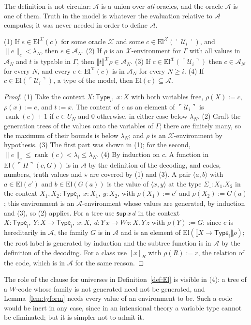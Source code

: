 \documentclass[10pt]{article}
\newcommand{\Type}{\mathsf{Type}}
\newcommand{\rk}{\operatorname{rank}}
\newcommand{\sem}[1]{\llbracket #1\rrbracket}
\newcommand{\El}{\mathrm{El}}
\newcommand{\code}[1]{\ulcorner #1\urcorner}
\newcommand{\U}{\mathcal{U}}
\newcommand{\X}{\mathcal{X}}
\newcommand{\A}{\mathcal{A}}
\begin{document}
The definition is not circular: $\A$ is a union over \emph{all} oracles,
and the oracle $\A$ is one of them. Truth in the model is whatever the
evaluation relative to $\A$ computes; it was never needed in order to
define $\A$.

\begin{lemma}\label{lem:gen}
(1) If $e\in\El^\X(c)$ for some oracle $\X$ and some $c\in\El^\X(\code{\U_i})$,
and $\|e\|_c<\lambda_N$, then $e\in\A_N$. (2) If $\rho$ is an
$\X$-environment for $\Gamma$ with all values in $\A_N$ and $t$ is typable
in $\Gamma$, then $\sem t^\X\rho\in\A_N$. (3) If $c\in\El^\X(\code{\U_i})$
then $c\in\A_N$ for every $N$, and every $e\in\El^\X(c)$ is in $\A_N$ for
every $N\ge i$. (4) If $c\in\El(\code{\U_i})$, a type of the model, then
$\El(c)\subseteq\A$.
\end{lemma}
\begin{proof}
(1) Take the context $X{:}\Type_i,\ x{:}X$ with both variables free,
$\rho(X):=c$, $\rho(x):=e$, and $t:=x$. The content of $c$ as an element
of $\code{\U_i}$ is $\rk(c)+1$ if $c\in U_N$ and $0$ otherwise, in either
case below $\lambda_N$. (2) Graft the generation trees of the values onto
the variables of $\Gamma$; there are finitely many, so the maximum of
their bounds is below $\lambda_N$; and $\rho$ is an $\X$-environment by
hypothesis. (3) The first part was shown in (1); for the second,
$\|e\|_c\le\rk(c)<\lambda_i\le\lambda_N$. (4) By induction on $c$. A
function in $\El(\code\Pi(c,G))$ is in $\A$ by the definition of the
decoding, and codes, numbers, truth values and $\star$ are covered by (1)
and (3). A pair $\langle a,b\rangle$ with $a\in\El(c')$ and
$b\in\El(G(a))$ is the value of $\langle x,y\rangle$ at the type
$\Sigma\_{:}X_1.X_2$ in the context $X_1,X_2{:}\Type_i,\ x{:}X_1,\ y{:}X_2$,
with $\rho(X_1):=c'$ and $\rho(X_2):=G(a)$; this environment is an
$\A$-environment whose values are generated, by induction and (3), so
(2) applies. For a tree use $\mathsf{sup}\,x\,d$ in the context
$X{:}\Type_i,\ Y{:}X\to\Type_i,\ x{:}X,\ d{:}Y\,x\to Wz{:}X.\,Y\,z$ with
$\rho(Y):=G$: since $c$ is hereditarily in $\A$, the family $G$ is in
$\A$ and is an element of $\El(\sem{X\to\Type_i}\rho)$; the root label is
generated by induction and the subtree function is in $\A$ by the
definition of the decoding. For a class use $[x]_R$ with $\rho(R):=r$,
the relation of the code, which is in $\A$ for the same reason.
\end{proof}

The role of the clause for universes in Definition~\ref{def:El} is
visible in (4): a tree of a $W$-code whose family is not generated need
not be generated, and Lemma~\ref{lem:tyform} needs every value of an
environment to be. Such a code would be inert in any case, since in an
intensional theory a variable type cannot be eliminated; but it is
simpler not to admit it.
\end{document}
